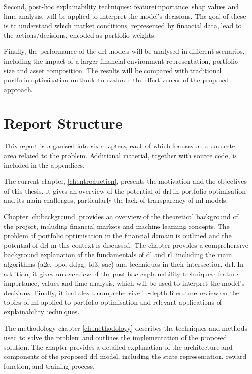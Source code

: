 Second, post-hoc explainability techniques: \Gls{featureimportance}, \acrfull{shap} values and \acrfull{lime} analysis, will be applied to interpret the model's decisions. The goal of these is to understand which market conditions, represented by financial data, lead to the actions/decisions, encoded as portfolio weights. 

Finally, the performance of the \acrshort{drl} models will be analysed in different scenarios, including the impact of a larger financial environment representation, portfolio size and asset composition. The results will be compared with traditional portfolio optimisation methods to evaluate the effectiveness of the proposed approach.

\section{Report Structure} \label{sec:introduction-structure}

This report is organised into six chapters, each of which focuses on a concrete area related to the problem. Additional material, together with source code, is included in the appendices. 

The current chapter, \ref{ch:introduction}, presents the motivation and the objectives of this thesis. It gives an overview of the potential of \acrshort{drl} in portfolio optimisation and its main challenges, particularly the lack of transparency of \acrshort{ml} models. 

Chapter \ref{ch:background} provides an overview of the theoretical background of the project, including financial markets and machine learning concepts. The problem of portfolio optimisation in the financial domain is outlined and the potential of \acrshort{drl} in this context is discussed. The chapter provides a comprehensive background explanation of the fundamentals of \acrlong{dl} and \acrlong{rl}, including the main algorithms (\acrshort{a2c}, \acrshort{ppo}, \acrshort{ddpg}, \acrshort{td3}, \acrshort{sac}) and techniques in their intersection, \acrshort{drl}. In addition, it gives an overview of the post-hoc explainability techniques: feature importance,  values and \acrfull{lime} analysis, which will be used to interpret the model's decisions. Finally, it includes a comprehensive in-depth literature review on the topics of \acrshort{ml} applied to portfolio optimisation and relevant applications of explainability techniques. 

The methodology chapter \ref{ch:methodology} describes the techniques and methods used to solve the problem and outlines the implementation of the proposed solution. The chapter provides a detailed explanation of the architecture and components of the proposed \acrshort{drl} model, including the state representation, reward function, and training process.

